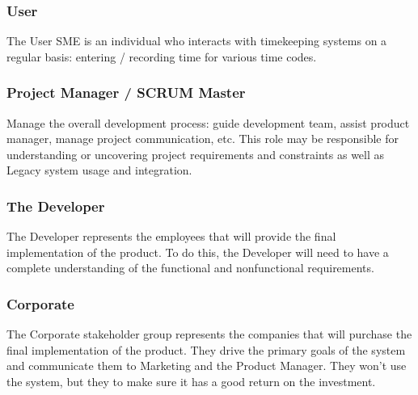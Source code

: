 \documentclass[12pt]{article}
\begin{document}
\subsubsection{User}
The User SME is an individual who interacts with timekeeping systems on a regular basis: entering / recording time for various time codes.

\subsubsection{Project Manager / SCRUM Master}
Manage the overall development process: guide development team, assist product manager, manage project communication, etc.  This role may be responsible for understanding or uncovering project requirements and constraints as well as Legacy system usage and integration.

\subsubsection{The Developer}
The Developer represents the employees that will provide the final implementation of the product. To do this, the Developer will need to have a complete understanding of the functional and nonfunctional requirements.

\subsubsection{Corporate}
The Corporate stakeholder group represents the companies that will purchase the final implementation of the product. They drive the primary goals of the system and communicate them to Marketing and the Product Manager. They won’t use the system, but they to make sure it has a good return on the investment.
\end{document}
